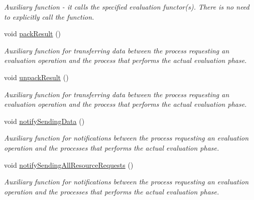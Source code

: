 \begin{CompactItemize}
\begin{CompactList}\small\item\em Auxiliary function - it calls the specified evaluation functor(s). There is no need to explicitly call the function. \item\end{CompactList}\item 
void \hyperlink{classpeoParaPopEval_24bb4ae84b0b9f64e7170e3d2b0e1223}{pack\-Result} ()
\begin{CompactList}\small\item\em Auxiliary function for transferring data between the process requesting an evaluation operation and the process that performs the actual evaluation phase. \item\end{CompactList}\item 
void \hyperlink{classpeoParaPopEval_fd7f0afe9cba30be39269d16097e190e}{unpack\-Result} ()
\begin{CompactList}\small\item\em Auxiliary function for transferring data between the process requesting an evaluation operation and the process that performs the actual evaluation phase. \item\end{CompactList}\item 
void \hyperlink{classpeoParaPopEval_1f78c3cec2940af08a059cc1aa96a9c8}{notify\-Sending\-Data} ()
\begin{CompactList}\small\item\em Auxiliary function for notifications between the process requesting an evaluation operation and the processes that performs the actual evaluation phase. \item\end{CompactList}\item 
void \hyperlink{classpeoParaPopEval_b77031fc4807921ffaf7cf6b669a7665}{notify\-Sending\-All\-Resource\-Requests} ()
\begin{CompactList}\small\item\em Auxiliary function for notifications between the process requesting an evaluation operation and the processes that performs the actual evaluation phase. \item\end{CompactList}\end{CompactItemize}

